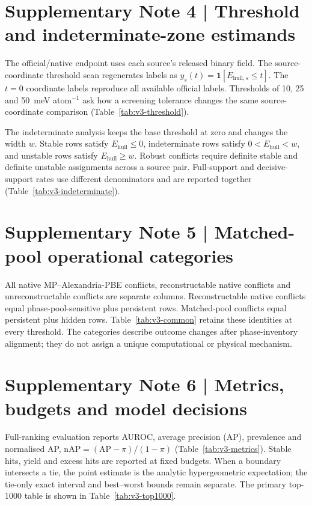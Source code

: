 \documentclass[a4paper,10pt]{article}
\begin{document}
\section*{Supplementary Note 4 | Threshold and indeterminate-zone estimands}
The official/native endpoint uses each source's released binary field. The source-coordinate threshold scan regenerates labels as $y_s(t)=\mathbf{1}[E_{\mathrm{hull},s}\leq t]$. The $t=0$ coordinate labels reproduce all available official labels. Thresholds of 10, 25 and 50~meV atom$^{-1}$ ask how a screening tolerance changes the same source-coordinate comparison (Table~\ref{tab:v3-threshold}).

The indeterminate analysis keeps the base threshold at zero and changes the width $w$. Stable rows satisfy $E_{\mathrm{hull}}\leq0$, indeterminate rows satisfy $0<E_{\mathrm{hull}}<w$, and unstable rows satisfy $E_{\mathrm{hull}}\geq w$. Robust conflicts require definite stable and definite unstable assignments across a source pair. Full-support and decisive-support rates use different denominators and are reported together (Table~\ref{tab:v3-indeterminate}).

\section*{Supplementary Note 5 | Matched-pool operational categories}
All native MP--Alexandria-PBE conflicts, reconstructable native conflicts and unreconstructable conflicts are separate columns. Reconstructable native conflicts equal phase-pool-sensitive plus persistent rows. Matched-pool conflicts equal persistent plus hidden rows. Table~\ref{tab:v3-common} retains these identities at every threshold. The categories describe outcome changes after phase-inventory alignment; they do not assign a unique computational or physical mechanism.

\section*{Supplementary Note 6 | Metrics, budgets and model decisions}
Full-ranking evaluation reports AUROC, average precision (AP), prevalence and normalised AP, $\mathrm{nAP}=(\mathrm{AP}-\pi)/(1-\pi)$ (Table~\ref{tab:v3-metrics}). Stable hits, yield and excess hits are reported at fixed budgets. When a boundary intersects a tie, the point estimate is the analytic hypergeometric expectation; the tie-only exact interval and best--worst bounds remain separate. The primary top-1000 table is shown in Table~\ref{tab:v3-top1000}.
\end{document}
